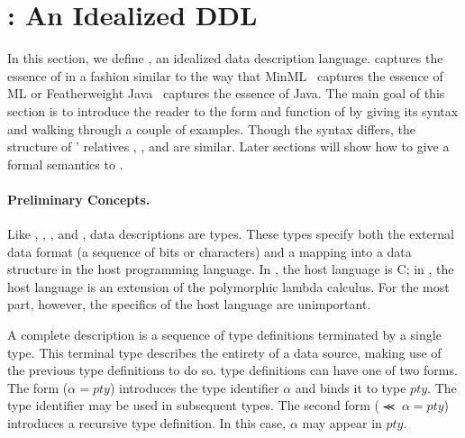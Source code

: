 \section{\ipads{}:  An Idealized DDL}
\label{sec:ipads}

In this section, we define \ipads{}, an idealized data description
language.  \ipads{} captures the essence of \pads{} in a fashion
similar to the way that MinML~\cite{harper:plbook} captures the essence of ML or Featherweight
Java~\cite{igarasi+:featherweight} captures the essence of Java.  The main goal of this section is to introduce
the reader to the form and function of \ipads{} by giving its syntax
and walking through a couple of examples.  Though the syntax differs,
the structure of \pads{}' relatives \blt{}, \packettypes{}, and
\datascript{} are similar.  Later sections will show how to give a
formal semantics to \ipads.

\paragraph*{Preliminary Concepts.}
Like \pads{}, \packettypes{}, \datascript{}, and \blt{}, \ipads{} data
descriptions are types.  These types specify both the external data
format (a sequence of bits or characters) and a mapping into a
data structure in the host programming language.  In \pads,
the host language is C; in \ipads, the host language is an extension
of the polymorphic lambda calculus.  For the most part, however, the
specifics of the host language are unimportant.

A complete \ipads{} description is a sequence of type definitions
terminated by a single type.  This terminal type describes the
entirety of a data source, making use of the previous 
type definitions to do so.  \ipads{} type definitions can have one of
two forms.  The form ($\alpha = pty$) introduces the type identifier
$\alpha$ and binds it to \ipads{} type $pty$.
The type identifier may be used in
subsequent types.  The second form  ($\Prec{}\; \alpha = pty$) introduces
a recursive type definition.  In this case, $\alpha$ may appear in 
$pty$.

